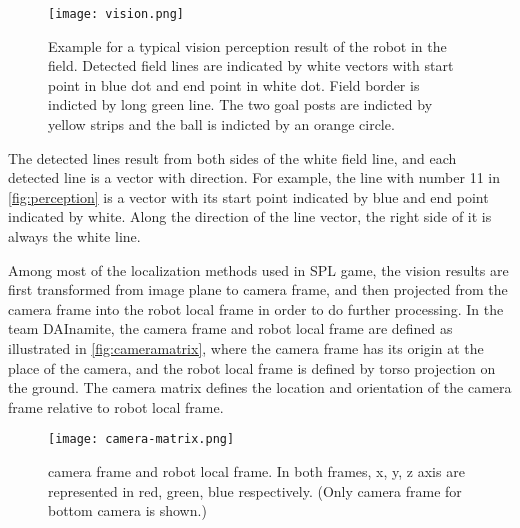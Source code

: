 \begin{figure}[h!]
  \centering
  \texttt{[image: vision.png]}
  \caption[Example for a typical vision perception result of the robot in the field.]{Example for a typical vision perception result of the robot in the field. Detected field lines are indicated by white vectors with start point in blue dot and end point in white dot. Field border is indicted by long green line. The two goal posts are indicted by yellow strips and the ball is indicted by an orange circle.}
  \label{fig:perception}
\end{figure}

The detected lines result from both sides of the white field line, and each detected line is a vector with direction. For example, the line with number 11 in \autoref{fig:perception} is a vector with its start point indicated by blue and end point indicated by white. Along the direction of the line vector, the right side of it is always the white line.

Among most of the localization methods used in \gls{SPL} game, the vision results are first transformed from image plane to camera frame, and then projected from the camera frame into the robot local frame in order to do further processing. In the team DAInamite, the camera frame and robot local frame are defined as illustrated in \autoref{fig:cameramatrix}, where the camera frame has its origin at the place of the camera, and the robot local frame is defined by torso projection on the ground. The camera matrix defines the location and orientation of the camera frame relative to robot local frame.
\begin{figure}[h!]
  \centering
  \texttt{[image: camera-matrix.png]}
  \caption[Only camera frame for bottom camera is shown]{camera frame and robot local frame. In both frames, x, y, z axis are represented in red, green, blue respectively. (Only camera frame for bottom camera is shown.)}
  \label{fig:cameramatrix}
\end{figure}

